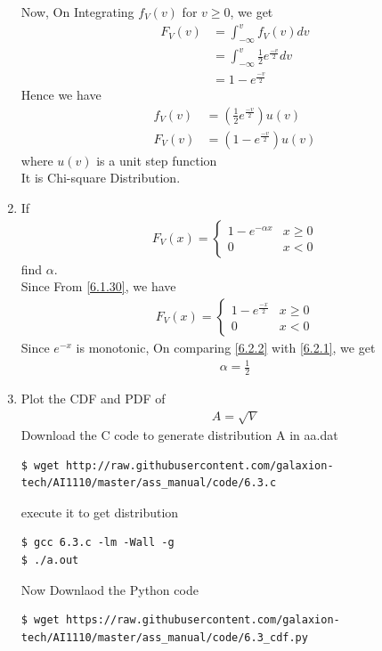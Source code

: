 \documentclass[journal,12pt,twocolumn]{IEEEtran}
\renewcommand\thesection{\arabic{section}}
\begin{document}
\begin{enumerate}[label=\thesection.\arabic*.,ref=\thesection.\theenumi]
Now, On Integrating $f_V(v)$ for $v \geq 0$, we get
\begin{align}
    F_V(v) &= \int_{-\infty}^{v} f_V(v) dv \\
    &= \int_{-\infty}^{v} \frac{1}{2}e^{\frac{-v}{2}} dv \\
    &= 1-e^{\frac{-v}{2}}
\end{align}
Hence we have
\begin{align}
    f_V(v) &= (\frac{1}{2}e^{\frac{-v}{2}})u(v)\\
    F_V(v) &= (1-e^{\frac{-v}{2}})u(v) \label{6.1.30}
\end{align}
where $u(v)$ is a unit step function\\
It is Chi-square Distribution.
\item If 
\begin{align}
    F_V(x) = \begin{cases}
        1-e^{-\alpha x} & x \geq 0\\
        0 & x < 0
    \end{cases} \label{6.2.1}
\end{align}
find $\alpha$.\\
\solution Since From \eqref{6.1.30}, we have
\begin{align}
    F_V(x) = \begin{cases}
        1-e^{\frac{-x}{2}} & x \geq 0 \\
        0 & x <0
    \end{cases} \label{6.2.2}
\end{align}
Since $e^{-x}$ is monotonic, On comparing \eqref{6.2.2} with \eqref{6.2.1}, we get
\begin{align}
    \alpha =\frac{1}{2}
\end{align}
\item Plot the CDF and PDF of \begin{align}
    A=\sqrt{V}
\end{align}
\solution Download the C code to generate distribution A in aa.dat
\begin{lstlisting}
$ wget http://raw.githubusercontent.com/galaxion-tech/AI1110/master/ass_manual/code/6.3.c
\end{lstlisting}
execute it to get distribution
\begin{lstlisting}
$ gcc 6.3.c -lm -Wall -g
$ ./a.out
\end{lstlisting}
Now Downlaod the Python code 
\begin{lstlisting}
$ wget https://raw.githubusercontent.com/galaxion-tech/AI1110/master/ass_manual/code/6.3_cdf.py

\end{lstlisting}
\end{enumerate}
\end{document}
